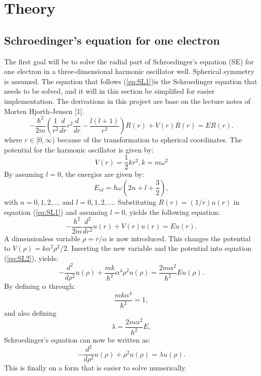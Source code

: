 \documentclass[10pt,a4paper,titlepage]{article}
\begin{document}
\section{Theory}
\subsection{Schroedinger's equation for one electron}
The first goal will be to solve the radial part of Schroedinger's equation (SE) for one electron in a three-dimensional harmonic oscillator well. Spherical symmetry is assumed. The equation that follows (\ref{eq:SL1})is the Schroedinger equation that needs to be solved, and it will in this section be simplified for easier implementation. The derivations in this project are base on the lecture notes of Morten Hjorth-Jensen [1].
\begin{equation}
\label{eq:SL1}
  -\frac{\hbar^2}{2 m} \left ( \frac{1}{r^2} \frac{d}{dr} r^2
  \frac{d}{dr} - \frac{l (l + 1)}{r^2} \right )R(r) 
     + V(r) R(r) = E R(r).
\end{equation} where $r\in[0,\infty)$ because of the transformation to spherical coordinates.
The potential for the harmonic oscillator is given by:
\begin{equation}
V(r) = \frac{1}{2}kr^{2}, k = m\omega^{2}
\end{equation}
By assuming $l=0$, the energies are given by:
\begin{equation}
\label{eq:energy1}
E_{nl}=  \hbar \omega \left(2n+l+\frac{3}{2}\right),
\end{equation}
with $n=0,1,2,\dots$ and $l=0,1,2,\dots$.
Substituting $R(r)=(1/r)u(r)$ in equation (\ref{eq:SL1}) and assuming $l=0$, yields the following equation:
\begin{equation}
\label{eq:SL2}
  -\frac{\hbar^2}{2 m} \frac{d^2}{dr^2} u(r) 
       + V(r)u(r)  = E u(r) .
\end{equation}
A dimensionless variable $\rho=r/ \alpha$ is now introduced. This changes the potential to $V(\rho)=k\alpha^{2}\rho^{2}/2$. Inserting the new variable and the potential into equation (\ref{eq:SL2}), yields:
\begin{equation}
\label{eq:SL3}
  -\frac{d^2}{d\rho^2} u(\rho) 
       + \frac{mk}{\hbar^2} \alpha^4\rho^2u(\rho)  = \frac{2m\alpha^2}{\hbar^2}E u(\rho) .
\end{equation}
By defining $\alpha$ through:
\begin{equation}
\dfrac{mk\alpha^{4}}{\hbar^{2}}=1,
\end{equation}
and also defining
\begin{equation}
\lambda = \frac{2m\alpha^2}{\hbar^2}E,
\end{equation}
Schroedinger's equation can now be written as:
\begin{equation}
\label{eq:SL4}
  -\frac{d^2}{d\rho^2} u(\rho) + \rho^2u(\rho)  = \lambda u(\rho).
\end{equation}
This is finally on a form that is easier to solve numerically.
\end{document}
